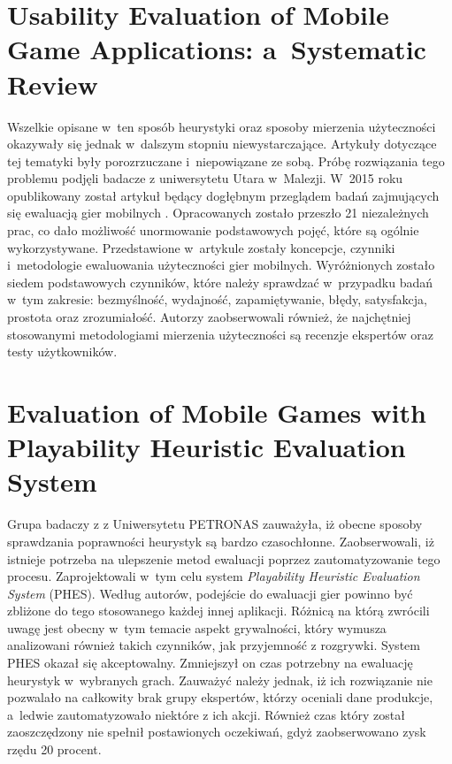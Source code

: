 \documentclass[a4paper,12pt,numbers=noenddot]{report}
\begin{document}
\section{Usability Evaluation of Mobile Game Applications: a~Systematic Review}
Wszelkie opisane w~ten sposób heurystyki oraz sposoby mierzenia użyteczności okazywały się jednak w~dalszym stopniu niewystarczające. Artykuły dotyczące tej tematyki były porozrzuczane i~niepowiązane ze sobą. Próbę rozwiązania tego problemu podjęli badacze z uniwersytetu Utara w~Malezji. W~2015 roku opublikowany został artykuł będący dogłębnym przeglądem badań zajmujących się ewaluacją gier mobilnych \cite{art_UsabilityEvaluationSystematicReview}. Opracowanych zostało przeszło 21 niezależnych prac, co dało możliwość unormowanie podstawowych pojęć, które są ogólnie  wykorzystywane. Przedstawione w~artykule zostały koncepcje, czynniki i~metodologie ewaluowania użyteczności gier mobilnych. Wyróżnionych zostało siedem podstawowych czynników, które należy sprawdzać w~przypadku badań w~tym zakresie: bezmyślność, wydajność, zapamiętywanie, błędy, satysfakcja, prostota oraz zrozumiałość. Autorzy zaobserwowali również, że najchętniej stosowanymi metodologiami mierzenia użyteczności są recenzje ekspertów oraz testy użytkowników.

\section{Evaluation of Mobile Games with Playability Heuristic Evaluation System}
Grupa badaczy z z Uniwersytetu PETRONAS zauważyła, iż obecne sposoby sprawdzania poprawności heurystyk są bardzo czasochłonne. \cite{art_evaluationOfMGevaluationSystem} Zaobserwowali, iż istnieje potrzeba na ulepszenie metod ewaluacji poprzez zautomatyzowanie tego procesu. Zaprojektowali w~tym celu system \textit{Playability Heuristic Evaluation System} (PHES). Według autorów, podejście do ewaluacji gier powinno być zbliżone do tego stosowanego każdej innej aplikacji. Różnicą na którą zwrócili uwagę jest obecny w~tym temacie aspekt grywalności, który wymusza analizowani również takich czynników, jak przyjemność z rozgrywki. System PHES okazał się akceptowalny. Zmniejszył on czas potrzebny na ewaluację heurystyk w~wybranych grach. Zauważyć należy jednak, iż ich rozwiązanie nie pozwalało na całkowity brak grupy ekspertów, którzy oceniali dane produkcje, a~ledwie zautomatyzowało niektóre z ich akcji. Również czas który został zaoszczędzony nie spełnił postawionych oczekiwań, gdyż zaobserwowano zysk rzędu 20 procent.
\end{document}
